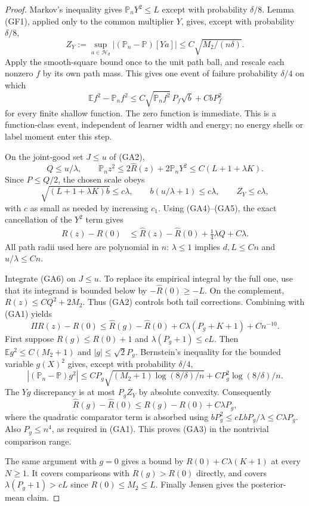 \begin{proof}
Markov's inequality gives $\mathbb P_nY^2\le L$ except with
probability $\delta/8$. Lemma (GF1), applied only to the common
multiplier $Y$, gives, except with probability $\delta/8$,
\[
 Z_Y:=\sup_{a\in\mathcal H_d}
       |(\mathbb P_n-\mathbb P)[Ya]|\le C\sqrt{M_2/(n\delta)}.
                                                               \tag{GA4}
\]
Apply the smooth-square bound once to the unit path ball, and
rescale each nonzero $f$ by its own path mass. This gives one event
of failure probability $\delta/4$ on which
\[
 \mathbb E f^2-\mathbb P_nf^2
 \le C\sqrt{\mathbb P_nf^2}\,P_f\sqrt b
                         +CbP_f^2                            \tag{GA5}
\]
for every finite shallow function. The zero function is immediate.
This is a function-class event, independent of learner width and
energy; no energy shells or label moment enter this step.

On the joint-good set $J\le u$ of (GA2),
\[
 Q\le u/\lambda,\qquad
 \mathbb P_n z^2\le2\widehat R(z)+2\mathbb P_nY^2
                       \le C(L+1+\lambda K).
\]
Since $P\le Q/2$, the chosen scale obeys
\[
 \sqrt{(L+1+\lambda K)b}\le c\lambda,
 \qquad b(u/\lambda+1)\le c\lambda,
 \qquad Z_Y\le c\lambda,
\]
with $c$ as small as needed by increasing $c_1$.
Using (GA4)--(GA5), the exact cancellation of the $Y^2$ term gives
\begin{align*}
 R(z)-R(0)
 &\le\widehat R(z)-\widehat R(0)
         +\tfrac14\lambda Q+C\lambda.                    \tag{GA6}
\end{align*}
All path radii used here are polynomial in $n$: $\lambda\le1$
implies $d,L\le Cn$ and $u/\lambda\le Cn$.

Integrate (GA6) on $J\le u$. To replace its empirical integral by
the full one, use that its integrand is bounded below by
$-\widehat R(0)\ge-L$. On the complement,
$R(z)\le C Q^2+2M_2$. Thus (GA2) controls both tail corrections.
Combining with (GA1) yields
\[
 \Pi R(z)-R(0)
 \le\widehat R(g)-\widehat R(0)
                 +C\lambda(P_g+K+1)+Cn^{-10}.             \tag{GA7}
\]
First suppose $R(g)\le R(0)+1$ and $\lambda(P_g+1)\le cL$.
Then $\mathbb Eg^2\le C(M_2+1)$ and $|g|\le\sqrt2P_g$.
Bernstein's inequality for the bounded variable $g(X)^2$ gives,
except with probability $\delta/4$,
\[
 |(\mathbb P_n-\mathbb P)g^2|
 \le CP_g\sqrt{(M_2+1)\log(8/\delta)/n}
                 +CP_g^2\log(8/\delta)/n.
\]
The $Yg$ discrepancy is at most $P_gZ_Y$ by absolute convexity.
Consequently
\[
 \widehat R(g)-\widehat R(0)
 \le R(g)-R(0)+C\lambda P_g,
\]
where the quadratic comparator term is absorbed using
$bP_g^2\le cLbP_g/\lambda\le C\lambda P_g$.
Also $P_g\le n^4$, as required in (GA1).
This proves (GA3) in the nontrivial comparison range.

The same argument with $g=0$ gives a bound by $R(0)+C\lambda(K+1)$
at every $N\ge1$. It covers comparisons with $R(g)>R(0)$ directly,
and covers $\lambda(P_g+1)>cL$ since $R(0)\le M_2\le L$.
Finally Jensen gives the posterior-mean claim.
\end{proof}

